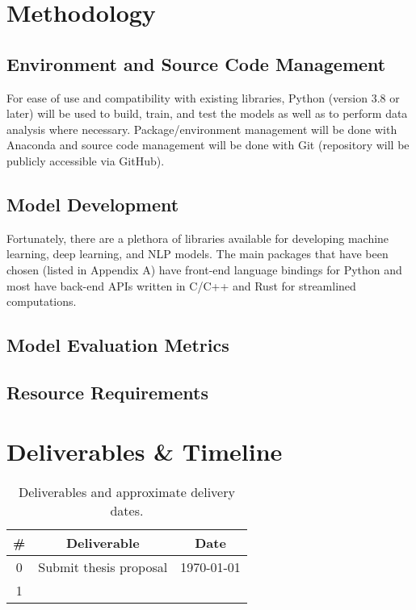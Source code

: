 \documentclass{article}
\begin{document}
    \section{Methodology}
        \subsection{Environment and Source Code Management}
            For ease of use and compatibility with existing libraries, Python (version 3.8 or later)
            will be used to build, train, and test the models as well as to perform data analysis
            where necessary.
            Package/environment management will be done with Anaconda and source code management
            will be done with Git (repository will be publicly accessible via GitHub).

        \subsection{Model Development}
            Fortunately, there are a plethora of libraries available for developing machine learning,
            deep learning, and NLP models.
            The main packages that have been chosen (listed in Appendix A) have front-end language
            bindings for Python and most have back-end APIs written in C/C++ and Rust for streamlined computations.

        \subsection{Model Evaluation Metrics}

        \subsection{Resource Requirements}

    \section{Deliverables \& Timeline}
        \begin{table}[h!]
            \centering
            \begin{tabular}{|c|c|c|}
                \hline
                \# & Deliverable & Date\\
                \hline
                0 & Submit thesis proposal & \today\\
                1 & & \\
                \hline
            \end{tabular}
            \label{table:timeline}
            \caption{Deliverables and approximate delivery dates.}
        \end{table}
\end{document}
